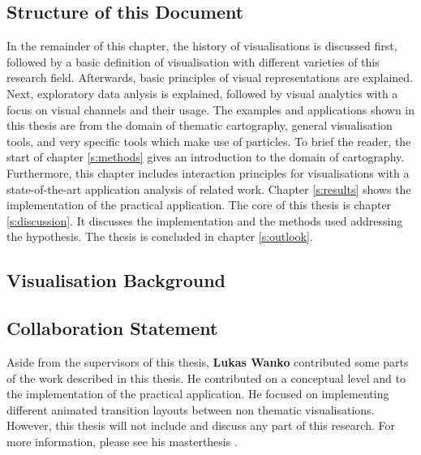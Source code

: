 \subsection{Structure of this Document}
In the remainder of this chapter, the history of visualisations is discussed first, followed by a basic definition of visualisation with different varieties of this research field. Afterwards, basic principles of visual representations are explained. Next, exploratory data anlysis is explained, followed by visual analytics with a focus on visual channels and their usage.
The examples and applications shown in this thesis are from the domain of thematic cartography, general visualisation tools, and very specific tools which make use of particles. To brief the reader, the start of chapter \ref{s:methods} gives an introduction to the domain of cartography. Furthermore, this chapter includes interaction principles for visualisations with a state-of-the-art application analysis of related work. Chapter \ref{s:results} shows the implementation of the practical application. The core of this thesis is chapter \ref{s:discussion}. It discusses the implementation and the methods used addressing the hypothesis. The thesis is concluded in chapter \ref{s:outlook}.

\subsection{Visualisation Background}


\subsection{Collaboration Statement}
\label{s:collaboration-statement}
Aside from the supervisors of this thesis, \textbf{Lukas Wanko} contributed some parts of the work described in this thesis. He contributed on a conceptual level and to the implementation of the practical application. He focused on implementing different animated transition layouts between non thematic visualisations. However, this thesis will not include and discuss any part of this research. For more information, please see his masterthesis .